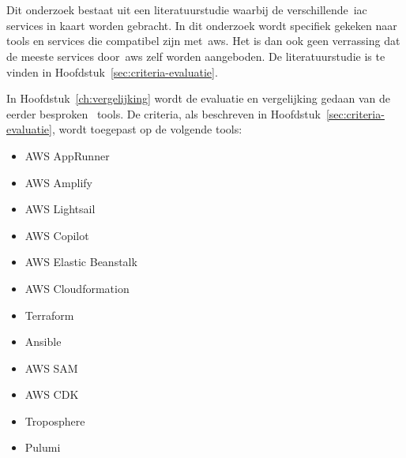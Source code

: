 
\chapter{}
\label{ch:methodologie}



Dit onderzoek bestaat uit een literatuurstudie waarbij de verschillende~\acrfull{iac} services in kaart worden gebracht.
In dit onderzoek wordt specifiek gekeken naar tools en services die compatibel zijn met~\acrshort{aws}.
Het is dan ook geen verrassing dat de meeste services door~\acrshort{aws} zelf worden aangeboden.
De literatuurstudie is te vinden in Hoofdstuk~\ref{sec:criteria-evaluatie}.

In Hoofdstuk~\ref{ch:vergelijking} wordt de evaluatie en vergelijking gedaan van de eerder besproken~ tools.
De criteria, als beschreven in Hoofdstuk~\ref{sec:criteria-evaluatie}, wordt toegepast op de volgende tools:

\begin{itemize}
    \item AWS AppRunner
    \item AWS Amplify
    \item AWS Lightsail
    \item AWS Copilot
    \item AWS Elastic Beanstalk
    \item AWS Cloudformation
    \item Terraform
    \item Ansible
    \item AWS SAM
    \item AWS CDK
    \item Troposphere
    \item Pulumi
\end{itemize}

